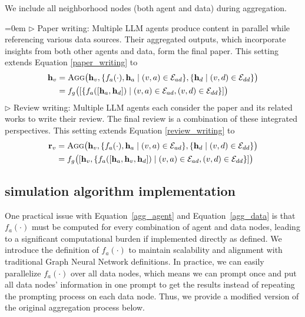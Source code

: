 We include all neighborhood nodes (both agent and data) during aggregation.

\hangindent=0em
$\triangleright$ Paper writing: Multiple LLM agents produce content in parallel while referencing various data sources. Their aggregated outputs, which incorporate insights from both other agents and data, form the final paper. 
This setting extends Equation \ref{paper_writing} to
\begin{equation} \begin{split} \mathbf{h}_{v} & = \textsc{Agg}\big( \mathbf{h}_v, \{f_a(\cdot), \mathbf{h}_a \mid (v,a) \in \mathcal{E}_{ad}\}, \{\mathbf{h}_d \mid (v,d) \in \mathcal{E}_{dd}\}\big) \\ & = f_g\bigl([\{f_a([\mathbf{h}_a, \mathbf{h}_d]) \mid (v,a) \in \mathcal{E}_{ad}, (v,d) \in \mathcal{E}_{dd}\}]\bigr) \end{split} \label{paper_writing_globalagg} \end{equation}
$\triangleright$ Review writing: Multiple LLM agents each consider the paper and its related works to write their review. The final review is a combination of these integrated perspectives.
This setting extends Equation \ref{review_writing} to
\begin{equation} \begin{split} \mathbf{r}_{v} & = \textsc{Agg}\big( \mathbf{h}_v, \{f_a(\cdot), \mathbf{h}_a \mid (v,a) \in \mathcal{E}_{ad}\}, \{\mathbf{h}_d \mid (v,d) \in \mathcal{E}_{dd}\}\big) \\ & = f_g\bigl([\mathbf{h}_v, \{f_a([\mathbf{h}_a, \mathbf{h}_v, \mathbf{h}_d]) \mid (v,a) \in \mathcal{E}_{ad}, (v,d) \in \mathcal{E}_{dd}\}]\bigr) \end{split} \label{review_writing_globalagg} \end{equation}


\subsection{\envname simulation algorithm implementation}
\label{simulation-algorithm-implementation}
One practical issue with Equation~\ref{agg_agent} and Equation~\ref{agg_data} is that $f_a(\cdot)$ must be computed for every combination of agent and data nodes, leading to a significant computational burden if implemented directly as defined. We introduce the definition of $f_a(\cdot)$ to maintain scalability and alignment with traditional Graph Neural Network definitions. In practice, we can easily parallelize $f_a(\cdot)$ over all data nodes, which means we can prompt once and put all data nodes' information in one prompt to get the results instead of repeating the prompting process on each data node. Thus, we provide a modified version of the original aggregation process below.

